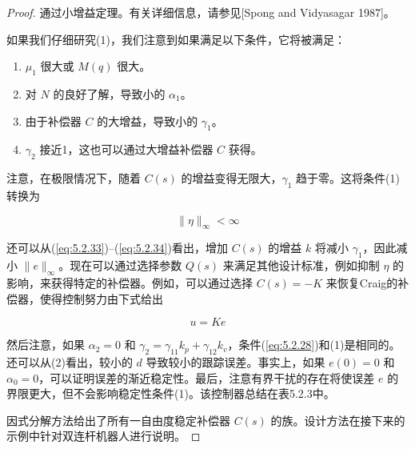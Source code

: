 \documentclass[UTF8,12pt,a4paper]{ctexart}
\begin{document}
\begin{proof}
通过小增益定理。有关详细信息，请参见[Spong and Vidyasagar 1987]。

如果我们仔细研究(1)，我们注意到如果满足以下条件，它将被满足：
\begin{enumerate}
    \item $\mu_1$ 很大或 $M(q)$ 很大。
    \item 对 $N$ 的良好了解，导致小的 $\alpha_1$。
    \item 由于补偿器 $C$ 的大增益，导致小的 $\gamma_1$。
    \item $\gamma_2$ 接近1，这也可以通过大增益补偿器 $C$ 获得。
\end{enumerate}

注意，在极限情况下，随着 $C(s)$ 的增益变得无限大，$\gamma_1$ 趋于零。这将条件(1)转换为

\begin{equation}\label{eq:5.2.34}
\|\eta\|_\infty < \infty
\end{equation}

还可以从(\ref{eq:5.2.33})--(\ref{eq:5.2.34})看出，增加 $C(s)$ 的增益 $k$ 将减小 $\gamma_1$，因此减小 $\|e\|_\infty$。现在可以通过选择参数 $Q(s)$ 来满足其他设计标准，例如抑制 $\eta$ 的影响，来获得特定的补偿器。例如，可以通过选择 $C(s) = -K$ 来恢复Craig的补偿器，使得控制努力由下式给出

\begin{equation}\label{eq:5.2.35}
u = Ke
\end{equation}

然后注意，如果 $\alpha_2 = 0$ 和 $\gamma_2 = \gamma_{11}k_p + \gamma_{12}k_v$，条件(\ref{eq:5.2.28})和(1)是相同的。还可以从(2)看出，较小的 $d$ 导致较小的跟踪误差。事实上，如果 $e(0) = 0$ 和 $\alpha_0 = 0$，可以证明误差的渐近稳定性。最后，注意有界干扰的存在将使误差 $e$ 的界限更大，但不会影响稳定性条件(1)。该控制器总结在表5.2.3中。

因式分解方法给出了所有一自由度稳定补偿器 $C(s)$ 的族。设计方法在接下来的示例中针对双连杆机器人进行说明。
\end{proof}
\end{document}
